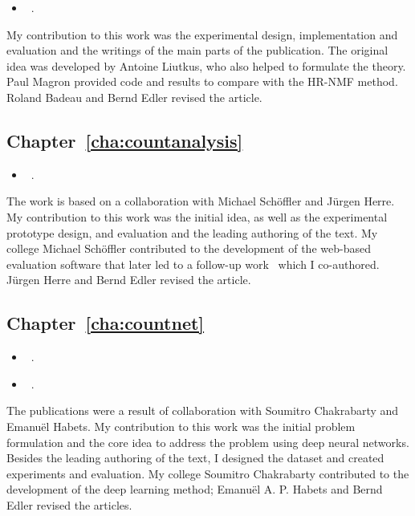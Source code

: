 \begin{itemize}
  \item[\cite{stoeter16}] ~.
\end{itemize}
\noindent
My contribution to this work was the experimental design, implementation and evaluation and the writings of the main parts of the publication.
The original idea was developed by Antoine Liutkus, who also helped to formulate the theory. Paul Magron provided code and results to compare with the HR-NMF method. Roland Badeau and Bernd Edler revised the article.

\subsection*{Chapter~\ref{cha:countanalysis}}

\begin{itemize}
  \item[\cite{stoeter13}] ~.
\end{itemize}
\noindent
The work is based on a collaboration with Michael Schöffler and Jürgen Herre.
My contribution to this work was the initial idea, as well as the experimental prototype design, and evaluation and the leading authoring of the text.
My college Michael Schöffler contributed to the development of the web-based evaluation software that later led to a follow-up work~\cite{schoeffler13} which I co-authored. Jürgen Herre and Bernd Edler revised the article.

\vfill
\subsection*{Chapter~\ref{cha:countnet}}

\begin{itemize}
  \item[\cite{stoeter19}] ~.
  \item[\cite{stoeter18}] ~.
\end{itemize}
\noindent
The publications were a result of collaboration with Soumitro Chakrabarty and Emanuël Habets. 
My contribution to this work was the initial problem formulation and the core idea to address the problem using deep neural networks. Besides the leading authoring of the text, I designed the dataset and created experiments and evaluation. 
My college Soumitro Chakrabarty contributed to the development of the deep learning method; Emanuël A. P. Habets and Bernd Edler revised the articles.


